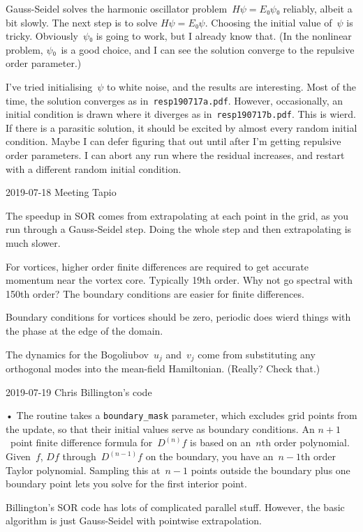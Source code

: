 Gauss-Seidel solves the harmonic oscillator problem~$Hψ=E₀ψ₀$ reliably, albeit a bit slowly.  The next step is to solve $Hψ=E₀ψ$.  Choosing the initial value of~$ψ$ is tricky.  Obviously~$ψ₀$ is going to work, but I already know that.  (In the nonlinear problem, $ψ₀$~is a good choice, and I can see the solution converge to the repulsive order parameter.)

I've tried initialising~$ψ$ to white noise, and the results are interesting.  Most of the time, the solution converges as in~{\tt resp190717a.pdf}.  However, occasionally, an initial condition is drawn where it diverges as in~{\tt resp190717b.pdf}.  This is wierd.  If there is a parasitic solution, it should be excited by almost every random initial condition.  Maybe I can defer figuring that out until after I'm getting repulsive order parameters.  I can abort any run where the residual increases, and restart with a different random initial condition.

2019-07-18 Meeting Tapio

The speedup in SOR comes from extrapolating at each point in the grid, as you run through a Gauss-Seidel step.  Doing the whole step and then extrapolating is much slower.

For vortices, higher order finite differences are required to get accurate momentum near the vortex core.  Typically 19th order.  Why not go spectral with 150th order?  The boundary conditions are easier for finite differences.

Boundary conditions for vortices should be zero, periodic does wierd things with the phase at the edge of the domain.

The dynamics for the Bogoliubov~$u_j$ and~$v_j$ come from substituting any orthogonal modes into the mean-field Hamiltonian.  (Really?  Check that.) 

2019-07-19 Chris Billington's code

\item• The routine takes a {\tt boundary_mask} parameter, which excludes grid points from the update, so that their initial values serve as boundary conditions.  An $n+1$~point finite difference formula for~$D^{(n)}f$ is based on an~$n$th order polynomial.  Given~$f$, $Df$ through~$D^{(n-1)}f$ on the boundary, you have an~$n-1$th order Taylor polynomial.  Sampling this at~$n-1$ points outside the boundary plus one boundary point lets you solve for the first interior point.

Billington's SOR code has lots of complicated parallel stuff.  However, the basic algorithm is just Gauss-Seidel with pointwise extrapolation.

